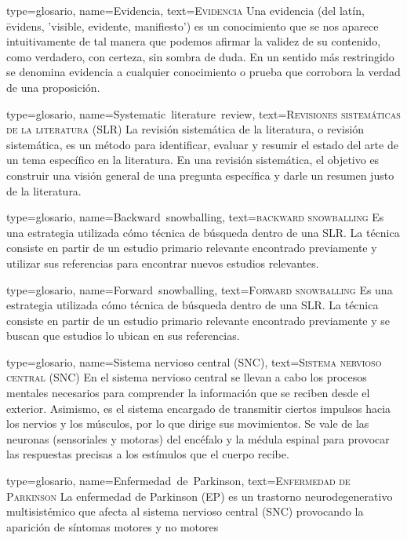 {
type={glosario},
name={Evidencia},
text={\textsc{Evidencia}}
}
{Una evidencia (del latín, ēvidens, 'visible, evidente, manifiesto') es un conocimiento que se nos aparece intuitivamente de tal manera que podemos afirmar la validez de su contenido, como verdadero, con certeza, sin sombra de duda. En un sentido más restringido se denomina evidencia a cualquier conocimiento o prueba que corrobora la verdad de una proposición.
}

{
type={glosario},
name={Systematic~literature~review},
text={\textsc{Revisiones sistem\'aticas de la literatura (SLR)}}
}
{La revisión sistemática de la literatura, o revisión sistemática, es un método para identificar, evaluar y resumir el estado del arte de un tema específico en la literatura. En una revisión sistemática, el objetivo es construir una visión general de una pregunta específica y darle un resumen justo de la literatura.
}

{
type={glosario},
name={Backward~snowballing},
text={\textsc{backward snowballing}}
}
{Es una estrategia utilizada cómo técnica de búsqueda dentro de una \gls{SLR}. La técnica consiste en partir de un estudio primario relevante encontrado previamente y utilizar sus referencias para encontrar nuevos estudios relevantes.
}

{
type={glosario},
name={Forward~snowballing},
text={\textsc{Forward snowballing}}
}
{Es una estrategia utilizada cómo técnica de búsqueda dentro de una \gls{SLR}. La técnica consiste en partir de un estudio primario relevante encontrado previamente y se buscan que estudios lo ubican en sus referencias. 
}

{
type={glosario},
name={Sistema nervioso central (SNC)},
text={\textsc{Sistema nervioso central (SNC)}}
}
{ En el sistema nervioso central se llevan a cabo los procesos mentales necesarios para comprender la información que se reciben desde el exterior. Asimismo, es el sistema encargado de transmitir ciertos impulsos hacia los nervios y los músculos, por lo que dirige sus movimientos. Se vale de las neuronas (sensoriales y motoras) del encéfalo y la médula espinal para provocar las respuestas precisas a los estímulos que el cuerpo recibe. 
}

{
type={glosario},
name={Enfermedad~de~Parkinson},
text={\textsc{Enfermedad de Parkinson}}
}
{La enfermedad de Parkinson (EP) es un trastorno neurodegenerativo multisistémico que afecta al sistema nervioso central (SNC) provocando la aparición de síntomas motores y no motores
}

